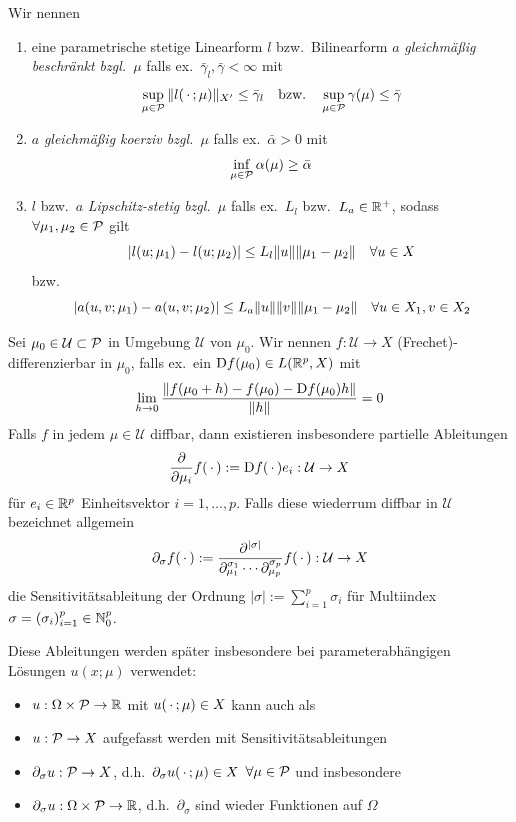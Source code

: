 \begin{defn}
	Wir nennen
	\begin{enumerate}
		\item eine parametrische stetige Linearform $l$ bzw.\ Bilinearform $a$ \emph{gleichmäßig beschränkt bzgl.\ $\mu$} falls ex.\ $\bar \gamma_l, \bar \gamma < \infty$ mit
			\[
				\sup_{\mu \in \mathcal{P}} \|l(\,\cdot\,;\mu)\|_{X'} \leq \bar \gamma_l \quad \text{bzw.} \quad \sup_{\mu \in \mathcal{P}} \gamma(\mu) \leq \bar\gamma
			\]
		\item $a$ \emph{gleichmäßig koerziv bzgl.\ $\mu$} falls ex.\ $\bar\alpha > 0$ mit
			\[
				\inf_{\mu \in \mathcal{P}} \alpha(\mu) \geq \bar \alpha
			\]
		\item $l$ bzw.\ $a$ \emph{Lipschitz-stetig bzgl.\ $\mu$} falls ex.\ $L_l$ bzw.\ $L_a \in \mathbb{R}^+$, sodass $\forall \mu_1,\mu_2 \in \mathcal{P}$ gilt
			\[
				|l(u;\mu_1)-l(u;\mu_2)| \leq L_l \|u\| \|\mu_1-\mu_2\| \quad \forall u \in X
			\]
			bzw.
			\[
				|a(u,v;\mu_1)-a(u,v;\mu_2)| \leq L_a \|u\| \|v\| \|\mu_1-\mu_2\| \quad \forall u \in X_1, v \in X_2
			\]
	\end{enumerate}
\end{defn}

\begin{defn}[Sensitivitätsableitung]
	Sei $\mu_0 \in \mathcal U \subset \mathcal{P}$ in Umgebung $\mathcal U$ von $\mu_0$.
	Wir nennen $f : \mathcal U \to X $ (Frechet)-differenzierbar in $\mu_0$, falls ex.\ ein $\mathrm{D} f(\mu_0) \in L(\mathbb{R}^p, X)$ mit
	\[
		\lim_{h \to 0} \frac{\|f(\mu_0+h)-f(\mu_0)-\mathrm{D} f(\mu_0) h\|}{\|h\|} = 0
	\]
	Falls $f$ in jedem $\mu \in \mathcal U$ diffbar, dann existieren insbesondere partielle Ableitungen
	\[
		\frac{\partial}{\partial {\mu_i}} f(\,\cdot\,) := \mathrm{D} f(\,\cdot\,) e_i : \mathcal U \to X
	\]
	für $e_i \in \mathbb{R}^p$ Einheitsvektor $i = 1,\dots,p$.
	Falls diese wiederrum diffbar in $\mathcal U$ bezeichnet allgemein
	\[
		\partial_\sigma f(\,\cdot\,) := \frac{\partial^{|\sigma|}}{\partial_{\mu_1}^{\sigma_1} \cdots \partial_{\mu_p}^{\sigma_p}} f(\,\cdot\,) : \mathcal U \to X
	\]
	die Sensitivitätsableitung der Ordnung $|\sigma| := \sum_{i=1}^p \sigma_i$ für Multiindex $\sigma = (\sigma_i)_{i=1}^p \in \mathbb{N}_0^p$.
\end{defn}

\begin{bem}
	Diese Ableitungen werden später insbesondere bei parameterabhängigen Lösungen $u(x;\mu)$ verwendet:
	\begin{itemize}
		\item[] $u : \Omega \times \mathcal{P} \to \mathbb{R}$ mit $u(\,\cdot\,; \mu) \in X$ kann auch als
		\item[] $u : \mathcal{P} \to X$ aufgefasst werden mit Sensitivitätsableitungen
		\item[] $\partial_\sigma u : \mathcal{P} \to X$, d.h.\ $\partial_\sigma u(\,\cdot\,;\mu) \in X$ $\forall \mu \in \mathcal{P}$ und insbesondere
		\item[] $\partial_\sigma u : \Omega \times \mathcal{P} \to \mathbb{R}$, d.h.\ $\partial_\sigma$ sind wieder Funktionen auf $\Omega$
	\end{itemize}
\end{bem}

